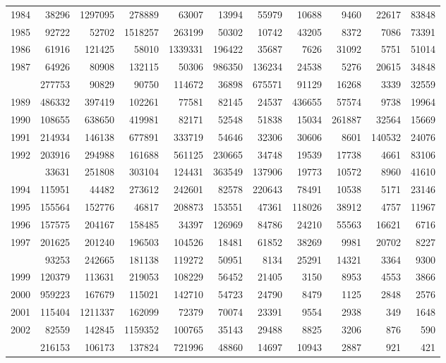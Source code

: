 \documentclass[
]{article}
\begin{document}
\begin{longtable}[t]{lrrrrrrrrrr}
1984 & 38296 & 1297095 & 278889 & 63007 & 13994 & 55979 & 10688 & 9460 & 22617 & 83848\\
1985 & 92722 & 52702 & 1518257 & 263199 & 50302 & 10742 & 43205 & 8372 & 7086 & 73391\\
1986 & 61916 & 121425 & 58010 & 1339331 & 196422 & 35687 & 7626 & 31092 & 5751 & 51014\\
1987 & 64926 & 80908 & 132115 & 50306 & 986350 & 136234 & 24538 & 5276 & 20615 & 34848\\
\addlinespace
1988 & 277753 & 90829 & 90750 & 114672 & 36898 & 675571 & 91129 & 16268 & 3339 & 32559\\
1989 & 486332 & 397419 & 102261 & 77581 & 82145 & 24537 & 436655 & 57574 & 9738 & 19964\\
1990 & 108655 & 638650 & 419981 & 82171 & 52548 & 51838 & 15034 & 261887 & 32564 & 15669\\
1991 & 214934 & 146138 & 677891 & 333719 & 54646 & 32306 & 30606 & 8601 & 140532 & 24076\\
1992 & 203916 & 294988 & 161688 & 561125 & 230665 & 34748 & 19539 & 17738 & 4661 & 83106\\
\addlinespace
1993 & 33631 & 251808 & 303104 & 124431 & 363549 & 137906 & 19773 & 10572 & 8960 & 41610\\
1994 & 115951 & 44482 & 273612 & 242601 & 82578 & 220643 & 78491 & 10538 & 5171 & 23146\\
1995 & 155564 & 152776 & 46817 & 208873 & 153551 & 47361 & 118026 & 38912 & 4757 & 11967\\
1996 & 157575 & 204167 & 158485 & 34397 & 126969 & 84786 & 24210 & 55563 & 16621 & 6716\\
1997 & 201625 & 201240 & 196503 & 104526 & 18481 & 61852 & 38269 & 9981 & 20702 & 8227\\
\addlinespace
1998 & 93253 & 242665 & 181138 & 119272 & 50951 & 8134 & 25291 & 14321 & 3364 & 9300\\
1999 & 120379 & 113631 & 219053 & 108229 & 56452 & 21405 & 3150 & 8953 & 4553 & 3866\\
2000 & 959223 & 167679 & 115021 & 142710 & 54723 & 24790 & 8479 & 1125 & 2848 & 2576\\
2001 & 115404 & 1211337 & 162099 & 72379 & 70074 & 23391 & 9554 & 2938 & 349 & 1648\\
2002 & 82559 & 142845 & 1159352 & 100765 & 35143 & 29488 & 8825 & 3206 & 876 & 590\\
\addlinespace
2003 & 216153 & 106173 & 137824 & 721996 & 48860 & 14697 & 10943 & 2887 & 921 & 421\\

\end{longtable}
\end{document}
